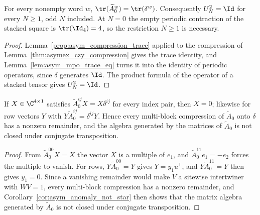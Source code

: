 \begin{lemma}
    \label{thm:asymex_czy_square_identity}
    \leanok
    For every nonempty word $w$, $\tr(\widetilde A_0^w)=\tr(\delta^w)$.
    Consequently $U_N^2=\Id$ for every $N\geq1$, odd $N$ included. At
    $N=0$ the empty periodic contraction of the stacked square is
    $\tr(\Id_4)=4$, so the restriction $N\geq1$ is necessary.
\end{lemma}

\begin{proof}
    \leanok
    Lemma~\ref{prop:asym_compression_trace} applied to the
    compression of Lemma~\ref{thm:asymex_czy_compression} gives the
    trace identity, and Lemma~\ref{lem:asym_mpo_trace_eq} turns it into
    the identity of periodic operators, since $\delta$ generates $\Id$.
    The product formula of the operator of a stacked tensor gives
    $U_N^2=\Id$.
\end{proof}

\begin{lemma}
    \label{thm:asymex_czy_no_intertwiner}
    \leanok
    If $X\in\C^{4\times1}$ satisfies $\widetilde A_0^{ij}X=X\delta^{ij}$
    for every index pair, then $X=0$; likewise for row vectors $Y$ with
    $Y\widetilde A_0^{ij}=\delta^{ij}Y$. Hence every multi-block
    compression of $\widetilde A_0$ onto $\delta$ has a nonzero remainder,
    and the algebra generated by the matrices of $\widetilde A_0$ is not
    closed under conjugate transposition.
\end{lemma}

\begin{proof}
    \leanok
    From $\widetilde A_0^{00}X=X$ the vector $X$ is a multiple of $e_1$,
    and $\widetilde A_0^{11}e_1=-e_2$ forces the multiple to vanish. For
    rows, $Y\widetilde A_0^{00}=Y$ gives $Y=y_1u^{\mathsf T}$, and
    $Y\widetilde A_0^{11}=Y$ then gives $y_1=0$. Since a vanishing
    remainder would make $V$ a sitewise intertwiner with $WV=1$, every
    multi-block compression has a nonzero remainder, and
    Corollary~\ref{cor:asym_anomaly_not_star} then shows that the matrix
    algebra generated by $\widetilde A_0$ is not closed under conjugate
    transposition.
\end{proof}

